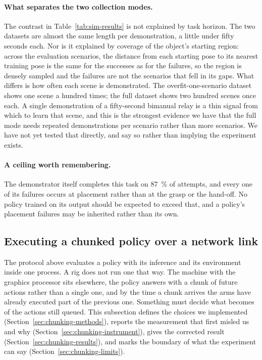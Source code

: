 \paragraph{What separates the two collection modes.}
The contrast in Table~\ref{tab:sim-results} is not explained by task horizon.
The two datasets are almost the same length per demonstration, a little under
fifty seconds each. Nor is it explained by coverage of the object's starting
region: across the evaluation scenarios, the distance from each starting pose
to its nearest training pose is the same for the successes as for the
failures, so the region is densely sampled and the failures are not the
scenarios that fell in its gaps. What differs is how often each scene is
demonstrated. The overfit-one-scenario dataset shows one scene a hundred
times; the full dataset shows two hundred scenes once each. A single
demonstration of a fifty-second bimanual relay is a thin signal from which to
learn that scene, and this is the strongest evidence we have that the full
mode needs repeated demonstrations per scenario rather than more scenarios.
We have not yet tested that directly, and say so rather than implying the
experiment exists.

\paragraph{A ceiling worth remembering.}
The demonstrator itself completes this task on \SI{87}{\percent} of attempts,
and every one of its failures occurs at placement rather than at the grasp or
the hand-off. No policy trained on its output should be expected to exceed
that, and a policy's placement failures may be inherited rather than its own.

\subsection{Executing a chunked policy over a network link}
\label{sec:chunking}

The protocol above evaluates a policy with its inference and its environment
inside one process. A rig does not run one that way. The machine with the
graphics processor sits elsewhere, the policy answers with a chunk of future
actions rather than a single one, and by the time a chunk arrives the arms have
already executed part of the previous one. Something must decide what becomes
of the actions still queued. This subsection defines the choices we implemented
(Section~\ref{sec:chunking-methods}), reports the measurement that first misled
us and why (Section~\ref{sec:chunking-instrument}), gives the corrected result
(Section~\ref{sec:chunking-results}), and marks the boundary of what the
experiment can say (Section~\ref{sec:chunking-limits}).

